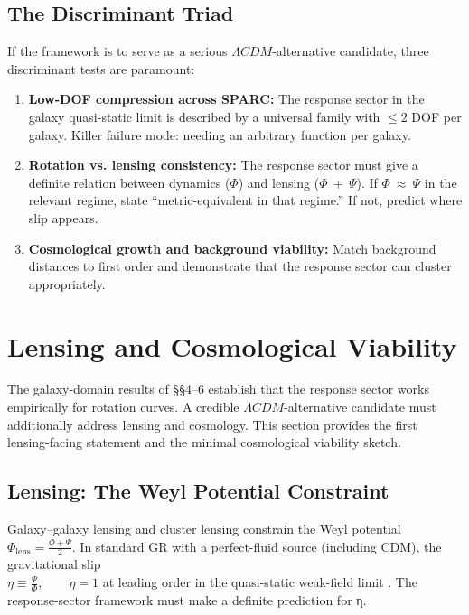 \documentclass[11pt]{article}
\begin{document}
\subsection{The Discriminant Triad}\label{the-discriminant-triad}

\citep{PoissonWill2014, Carroll2019}
If the framework is to serve as a serious \(\Lambda CDM\)-alternative candidate, three discriminant tests are paramount:

\begin{enumerate}
\def\labelenumi{(\roman{enumi})}
\item
  \textbf{Low-DOF compression across SPARC:} The response sector in the galaxy quasi-static limit is described by a universal family with \(\leq 2\) DOF per galaxy. Killer failure mode: needing an arbitrary function per galaxy.
\item
  \textbf{Rotation vs. lensing consistency:} The response sector must give a definite relation between dynamics (\(\Phi\)) and lensing (\(\Phi\  + \ \Psi\)). If \(\Phi\  \approx \ \Psi\) in the relevant regime, state ``metric-equivalent in that regime.'' If not, predict where slip appears.
\item
  \textbf{Cosmological growth and background viability:} Match background distances to first order and demonstrate that the response sector can cluster appropriately.
\end{enumerate}


\section{Lensing and Cosmological Viability}\label{lensing-and-cosmological-viability}

The galaxy-domain results of §§4--6 establish that the response sector works empirically for rotation curves. A credible \(\Lambda CDM\)-alternative candidate must additionally address lensing and cosmology. This section provides the first lensing-facing statement and the minimal cosmological viability sketch.

\subsection{Lensing: The Weyl Potential Constraint}\label{lensing-the-weyl-potential-constraint}

Galaxy--galaxy lensing and cluster lensing constrain the Weyl potential \(\Phi_{\text{lens}} = \frac{\Phi + \Psi}{2}\). In standard GR with a perfect-fluid source (including CDM), the gravitational slip\\
\(\eta \equiv \frac{\Psi}{\Phi},\quad\quad\eta = 1\) at leading order in the quasi-static weak-field limit \citep{PoissonWill2014, Wald1984GR}. The response-sector framework must make a definite prediction for η.
\end{document}

